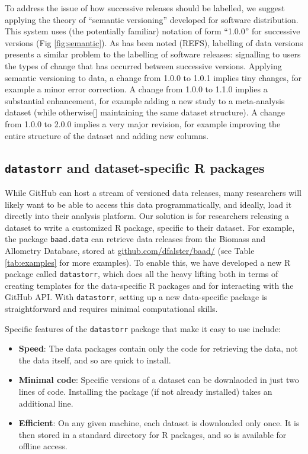 \documentclass[a4paper,11pt]{article}
\newcommand{\smurl}[1]{{\footnotesize\url{#1}}}
\begin{document}
To address the issue of how successive releases should be labelled, we suggest
applying the theory of ``semantic versioning'' developed for software
distribution. This system uses (the potentially familiar) notation of form
``1.0.0'' for successive versions (Fig \ref{fig:semantic}). As has been noted
(REFS), labelling of data versions presents a similar problem to the labelling
of software releases: signalling to users the types of change that has
occurred between successive versions. Applying semantic versioning to data, a
change from 1.0.0 to 1.0.1 implies tiny changes, for example a minor error
correction. A change from 1.0.0 to 1.1.0 implies a substantial enhancement,
for example adding a new study to a meta-analysis dataset (while otherwise[]
maintaining the same dataset structure). A change from 1.0.0 to 2.0.0 implies
a very major revision, for example improving the entire structure of the
dataset and adding new columns.

\subsection{\texttt{datastorr} and dataset-specific R packages}

While GitHub can host a stream of versioned data releases, many researchers will likely want to be able to access this data programmatically, and ideally, load it directly into their analysis platform. Our solution is for researchers releasing a dataset to write a customized R package, specific to their dataset. For example, the package
\texttt{baad.data} can retrieve data releases from the Biomass and Allometry Database, stored at \smurl{github.com/dfalster/baad/} (see Table \ref{tab:examples} for more examples). To enable this, we have developed a new R package called \texttt{datastorr}, which does all the heavy lifting both in terms of creating templates for the data-specific R packages and for interacting with the GitHub API. With \texttt{datastorr}, setting up a new data-specific package is straightforward and requires minimal computational skills. 

Specific features of the \texttt{datastorr} package that make it easy to use include:

\begin{itemize}
  \item \textbf{Speed}: The data packages contain only the code for retrieving the data, not the data itself, and so are quick to install.
  \item \textbf{Minimal code}: Specific versions of a dataset can be downlaoded in just two lines of code. Installing the package (if not already installed) takes an additional line.
  \item \textbf{Efficient}: On any given machine, each dataset is downloaded only once. It is then stored in a standard directory for R packages, and so is available for offline access.
\end{itemize}
\end{document}
